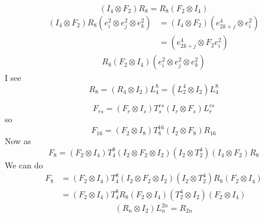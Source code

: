 \documentclass{article}
\begin{document}
	\begin{equation}
		(I_4 \otimes F_2)R_8=R_8(F_2 \otimes I_4)
	\end{equation}
	\begin{align}
		(I_4 \otimes F_2)R_8(e^2_i \otimes e^2_j \otimes e^2_k)&=(I_4 \otimes F_2)(e^4_{2k+j} \otimes e^2_i) \\
		&=(e^4_{2k+j} \otimes F_2e^2_i)
	\end{align}
	\begin{align}
		R_8(F_2 \otimes I_4)(e^2_i \otimes e^2_j \otimes e^2_k)
	\end{align}
	I see
	\begin{equation}
		R_8 =(R_4 \otimes I_2)L^8_4=(L^4_2 \otimes I_2)L^8_4
	\end{equation}
	
	\begin{equation}
		F_{rs} = (F_r \otimes I_s)T^{rs}_s(I_r \otimes F_s) L^{rs}_r
	\end{equation}
	so
	\begin{equation}
		F_{16}=(F_2 \otimes I_8)T^{16}_8(I_2 \otimes F_8)R_{16}
	\end{equation}
	Now as
	\begin{equation}
		F_8=(F_2 \otimes I_4) T^8_4(I_2 \otimes F_2 \otimes I_2)(I_2 \otimes T^4_2)(I_4 \otimes F_2)R_8
	\end{equation}
	We can do
	\begin{align}
		F_8&=(F_2 \otimes I_4) T^8_4(I_2 \otimes F_2 \otimes I_2)(I_2 \otimes T^4_2)R_8(F_2 \otimes I_4)\\
		&=(F_2 \otimes I_4) T^8_4R_8(F_2 \otimes I_4)(T^4_2 \otimes I_2)(F_2 \otimes I_4)
	\end{align}
\begin{equation}
	(R_n \otimes I_2)L^{2n}_n = R_{2n}
\end{equation}
\end{document}
